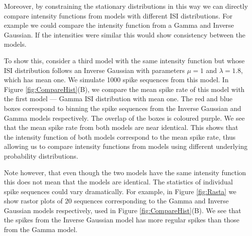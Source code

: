 \documentclass[oneside, 12 pt]{book}
\begin{document}
    
    
Moreover, by constraining the stationary distributions in this way we can directly compare intensity functions from models with different ISI distributions. For example we could compare the intensity function from a Gamma and Inverse Gaussian. If the intensities were similar this would show consistency between the models.   

To show this, consider a third model with the same intensity function but whose ISI distribution follows an Inverse Gaussian with parameters $\mu =1$ and $\lambda=1.8$, which has mean one. We simulate 1000 spike sequences from this model. In Figure \ref{fig:CompareHist}(B), we compare the mean spike rate of this model with the first model ---  Gamma ISI distribution with mean one. The red and blue boxes correspond to binning the spike sequences from the Inverse Gaussian and Gamma models respectively. The overlap of the boxes is coloured purple. We see that the mean spike rate from both models are near identical. This shows that the intensity function of both models correspond to the mean spike rate, thus allowing us to compare intensity functions from models using different underlying probability distributions. 

Note however, that even though the two models have the same intensity function this does not mean that the models are identical. The statistics of individual spike sequences could vary dramatically. For example, in Figure \ref{fig:Rasta} we show rastor plots of $20$ sequences corresponding to the Gamma and Inverse Gaussian models respectively, used in Figure \ref{fig:CompareHist}(B). We see that the spikes from the Inverse Gaussian model has more regular spikes than those from the Gamma model. 


\end{document}
